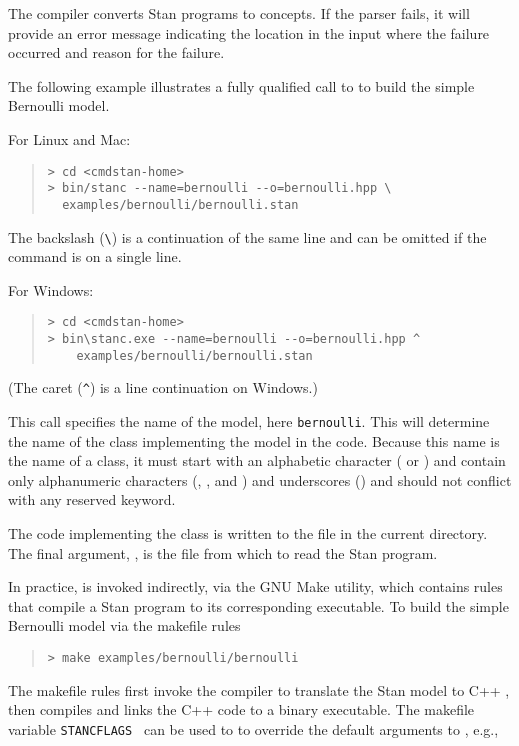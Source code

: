 The \stanc compiler converts Stan programs to \Cpp concepts.
If the parser fails, it will provide an error
message indicating the location in the input where the failure
occurred and reason for the failure.

The following example illustrates a fully qualified call to \stanc
to build the simple Bernoulli model. 

For Linux and Mac:
%
\begin{quote}
\begin{Verbatim}[fontshape=sl]
> cd <cmdstan-home>
> bin/stanc --name=bernoulli --o=bernoulli.hpp \
  examples/bernoulli/bernoulli.stan 
\end{Verbatim}
\end{quote}
%
The backslash (\Verb|\|) is a continuation of the same line and can be
omitted if the command is on a single line.

For Windows:
%
\begin{quote}
\begin{Verbatim}[fontshape=sl]
> cd <cmdstan-home>
> bin\stanc.exe --name=bernoulli --o=bernoulli.hpp ^
    examples/bernoulli/bernoulli.stan 
\end{Verbatim}
\end{quote}
%
(The caret (\Verb|^|) is a line continuation on Windows.)

This call specifies the name of the model, here {\tt bernoulli}.
This will determine the name of the class implementing the model in
the \Cpp code.  Because this name is the name of a \Cpp class, it must
start with an alphabetic character ( or ) and
contain only alphanumeric characters (\code{a--z}, \code{A--Z}, and
\code{0--9}) and underscores (\code{\_}) and should not conflict with
any \Cpp reserved keyword.  

The \Cpp code implementing the class is written to the file
 in the current directory.  The final argument,
\code{bernoulli.stan}, is the file from which to read the Stan program.

In practice, \stanc is invoked indirectly, via the GNU Make utility,
which contains rules that compile a Stan program
to its corresponding executable.
To build the simple Bernoulli model via the makefile rules
%
\begin{quote}
\begin{Verbatim}[fontshape=sl]
> make examples/bernoulli/bernoulli
\end{Verbatim}
\end{quote}
%
The makefile rules first invoke the \stanc compiler to translate the Stan model to C++ ,
then compiles and links the C++ code to a binary executable.
The makefile variable {\tt STANCFLAGS } can be used to
to override the default arguments to \stanc, e.g.,

